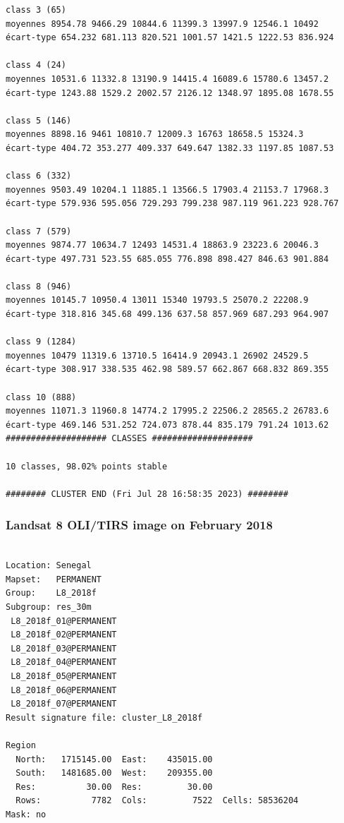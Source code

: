 \documentclass[earth,article,submit,pdftex,moreauthors]{Definitions/mdpi}
\begin{document}
{\begin{scriptsize}
\begin{verbatim}
class 3 (65)
moyennes 8954.78 9466.29 10844.6 11399.3 13997.9 12546.1 10492
écart-type 654.232 681.113 820.521 1001.57 1421.5 1222.53 836.924

class 4 (24)
moyennes 10531.6 11332.8 13190.9 14415.4 16089.6 15780.6 13457.2
écart-type 1243.88 1529.2 2002.57 2126.12 1348.97 1895.08 1678.55

class 5 (146)
moyennes 8898.16 9461 10810.7 12009.3 16763 18658.5 15324.3
écart-type 404.72 353.277 409.337 649.647 1382.33 1197.85 1087.53

class 6 (332)
moyennes 9503.49 10204.1 11885.1 13566.5 17903.4 21153.7 17968.3
écart-type 579.936 595.056 729.293 799.238 987.119 961.223 928.767

class 7 (579)
moyennes 9874.77 10634.7 12493 14531.4 18863.9 23223.6 20046.3
écart-type 497.731 523.55 685.055 776.898 898.427 846.63 901.884

class 8 (946)
moyennes 10145.7 10950.4 13011 15340 19793.5 25070.2 22208.9
écart-type 318.816 345.68 499.136 637.58 857.969 687.293 964.907

class 9 (1284)
moyennes 10479 11319.6 13710.5 16414.9 20943.1 26902 24529.5
écart-type 308.917 338.535 462.98 589.57 662.867 668.832 869.355

class 10 (888)
moyennes 11071.3 11960.8 14774.2 17995.2 22506.2 28565.2 26783.6
écart-type 469.146 531.252 724.073 878.44 835.179 791.24 1013.62
#################### CLASSES ####################

10 classes, 98.02% points stable

######## CLUSTER END (Fri Jul 28 16:58:35 2023) ########

\end{verbatim}
\end{scriptsize}

\subsubsection[\appendixname~\thesubsubsection]{Landsat 8 OLI/TIRS image on February 2018}
\begin{scriptsize}
\begin{verbatim}

Location: Senegal
Mapset:   PERMANENT
Group:    L8_2018f
Subgroup: res_30m
 L8_2018f_01@PERMANENT
 L8_2018f_02@PERMANENT
 L8_2018f_03@PERMANENT
 L8_2018f_04@PERMANENT
 L8_2018f_05@PERMANENT
 L8_2018f_06@PERMANENT
 L8_2018f_07@PERMANENT
Result signature file: cluster_L8_2018f

Region
  North:   1715145.00  East:    435015.00
  South:   1481685.00  West:    209355.00
  Res:          30.00  Res:         30.00
  Rows:          7782  Cols:         7522  Cells: 58536204
Mask: no


\end{verbatim}
\end{scriptsize}}
\end{document}
